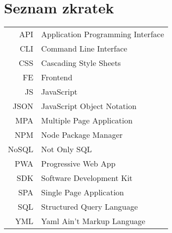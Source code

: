 
\chapter{Seznam zkratek}

\begin{tabular}{rl}
    API & Application Programming Interface \\
    CLI & Command Line Interface \\
    CSS & Cascading Style Sheets \\
    FE & Frontend \\
    JS & JavaScript \\
    JSON & JavaScript Object Notation \\
    MPA & Multiple Page Application \\
    NPM & Node Package Manager \\
    NoSQL & Not Only SQL \\
    PWA & Progressive Web App \\
    SDK & Software Development Kit \\
    SPA & Single Page Application \\
    SQL & Structured Query Language \\
    YML & Yaml Ain't Markup Language \\
\end{tabular}
